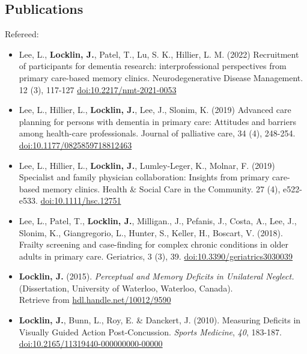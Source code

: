 \documentclass[10pt]{article}
\begin{document}
\pagebreak[3]

\subsection{Publications}\label{publications}

Refereed:

\begin{itemize}
\item
  Lee, L., \textbf{Locklin, J.}, Patel, T., Lu, S. K., Hillier, L. M.
  (2022) Recruitment of participants for dementia research:
  interprofessional perspectives from primary care-based memory clinics.
  Neurodegenerative Disease Management. 12 (3), 117-127
  \href{https://doi.org/10.2217/nmt-2021-0053}{doi:10.2217/nmt-2021-0053}
\item
  Lee, L., Hillier, L., \textbf{Locklin, J.}, Lee, J., Slonim, K. (2019)
  Advanced care planning for persons with dementia in primary care:
  Attitudes and barriers among health-care professionals. Journal of
  palliative care, 34 (4), 248-254.
  \href{https://doi.org/10.1177/0825859718812463}{doi:10.1177/0825859718812463}
\item
  Lee, L., Hillier, L., \textbf{Locklin, J.}, Lumley-Leger, K., Molnar,
  F. (2019) Specialist and family physician collaboration: Insights from
  primary care-based memory clinics. Health \& Social Care in the
  Community. 27 (4), e522-e533.
  \href{https://doi.org/10.1111/hsc.12751}{doi:10.1111/hsc.12751}
\item
  Lee, L., Patel, T., \textbf{Locklin, J.}, Milligan., J., Pefanis, J.,
  Costa, A., Lee, J., Slonim, K., Giangregorio, L., Hunter, S., Keller,
  H., Boscart, V. (2018). Frailty screening and case-finding for complex
  chronic conditions in older adults in primary care. Geriatrics, 3 (3),
  39.
  \href{http://dx.doi.org/10.3390/geriatrics3030039}{doi:10.3390/geriatrics3030039}
\item
  \textbf{Locklin, J.} (2015). \emph{Perceptual and Memory Deficits in
  Unilateral Neglect.} (Dissertation, University of Waterloo, Waterloo,
  Canada).\\
  Retrieve from
  \href{http://hdl.handle.net/10012/9590}{hdl.handle.net/10012/9590}
\item
  \textbf{Locklin, J.}, Bunn, L., Roy, E. \& Danckert, J. (2010).
  Measuring Deficits in Visually Guided Action Post-Concussion.
  \emph{Sports Medicine}, \emph{40}, 183-187.\\
  \href{http://dx.doi.org/10.2165/11319440-000000000-00000}{doi:10.2165/11319440-000000000-00000}

\end{itemize}
\end{document}
